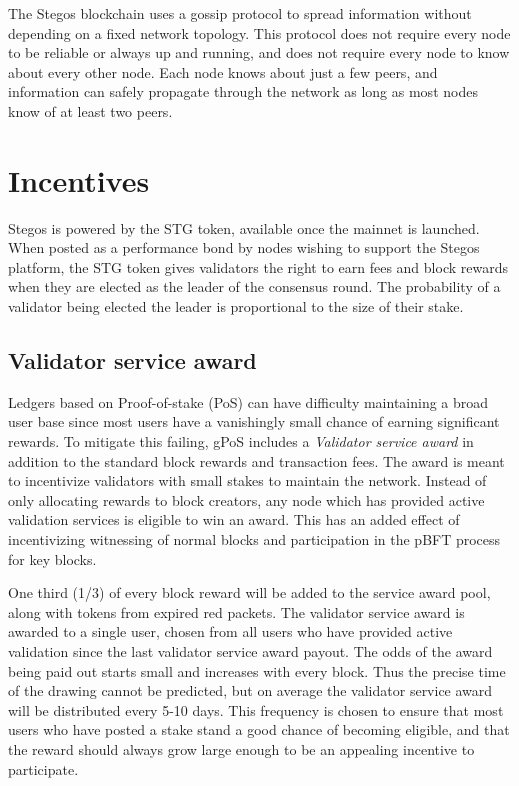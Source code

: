 \documentclass[8pt,fleqn,openany]{book}
\begin{document}
	The Stegos blockchain uses a gossip protocol to spread information without depending on a fixed network topology. This protocol does not require every node to be reliable or always up and running, and does not require every node to know about every other node. Each node knows about just a few peers, and information can safely propagate through the network as long as most nodes know of at least two peers.
	
	\section{Incentives}
	Stegos is powered by the STG token, available once the mainnet is launched. When posted as a performance bond by nodes wishing to support the Stegos platform, the STG token gives validators the right to earn fees and block rewards when they are elected as the leader of the consensus round. The probability of a validator being elected the leader is proportional to the size of their stake.
	
	\subsection{Validator service award}\label{sec:service-award}
	Ledgers based on Proof-of-stake (PoS) can have difficulty maintaining a broad user base since most users have a vanishingly small chance of earning significant rewards. To mitigate this failing, gPoS includes a \textit{Validator service award} in addition to the standard block rewards and transaction fees. The award is meant to incentivize validators with small stakes to maintain the network. Instead of only allocating rewards to block creators, any node which has provided active validation services is eligible to win an award. This has an added effect of incentivizing witnessing of normal blocks and participation in the pBFT process for key blocks.
	
	One third (1/3) of every block reward will be added to the service award pool, along with tokens from expired red packets. The validator service award is awarded to a single user, chosen from all users who have provided active validation since the last validator service award payout. The odds of the award being paid out starts small and increases with every block. Thus the precise time of the drawing cannot be predicted, but on average the validator service award will be distributed every 5-10 days. This frequency is chosen to ensure that most users who have posted a stake stand a good chance of becoming eligible, and that the reward should always grow large enough to be an appealing incentive to participate. 
	
\end{document}

